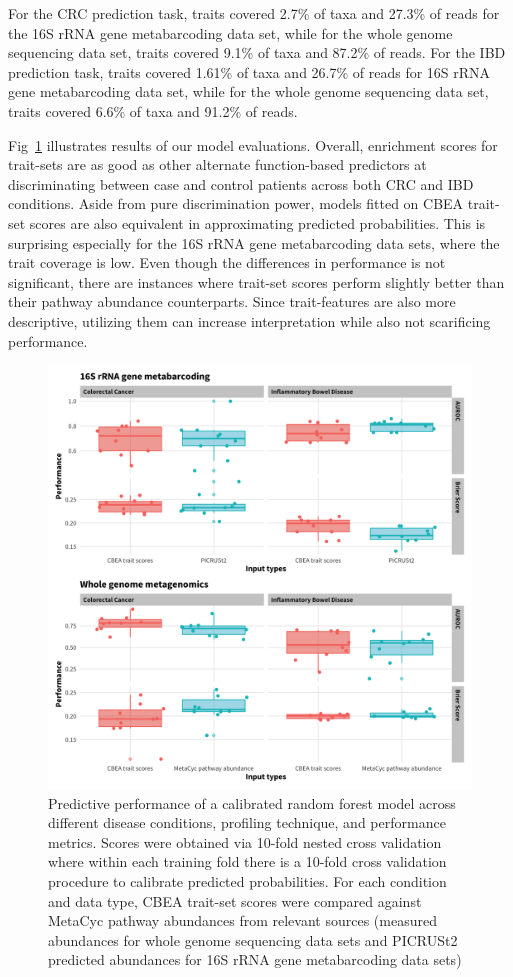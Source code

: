 \documentclass[10pt,letterpaper]{article}
\begin{document}
For the CRC prediction task, traits covered 2.7\% of taxa and 27.3\% of reads for the 16S rRNA gene metabarcoding data set, while for the whole genome sequencing data set, traits covered 9.1\% of taxa and 87.2\% of reads. For the IBD prediction task, traits covered 1.61\% of taxa and 26.7\% of reads for 16S rRNA gene metabarcoding data set, while for the whole genome sequencing data set, traits covered 6.6\% of taxa and 91.2\% of reads.  

Fig~\ref{fig:3} illustrates results of our model evaluations. Overall, enrichment scores for trait-sets are as good as other alternate function-based predictors at discriminating between case and control patients across both CRC and IBD conditions. Aside from pure discrimination power, models fitted on CBEA trait-set scores are also equivalent in approximating predicted probabilities. This is surprising especially for the 16S rRNA gene metabarcoding data sets, where the trait coverage is low. Even though the differences in performance is not significant, there are instances where trait-set scores perform slightly better than their pathway abundance counterparts. Since trait-features are also more descriptive, utilizing them can increase interpretation while also not scarificing performance.   

\begin{figure}[!h]
\includegraphics[width=0.99\linewidth]{figures/pred_performance.png}
\caption{Predictive performance of a calibrated random forest model across different disease conditions, profiling technique, and performance metrics. Scores were obtained via 10-fold nested cross validation where within each training fold there is a 10-fold cross validation procedure to calibrate predicted probabilities. For each condition and data type, CBEA trait-set scores were compared against MetaCyc pathway abundances from relevant sources (measured abundances for whole genome sequencing data sets and PICRUSt2 predicted abundances for 16S rRNA gene metabarcoding data sets)}
\label{fig:3}
\end{figure}
\end{document}
